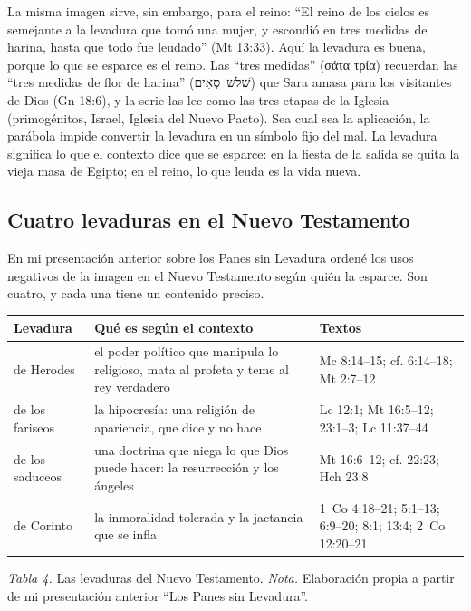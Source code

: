 \documentclass[11pt,letterpaper]{article}
\newcommand{\heb}[1]{\mbox{\foreignlanguage{hebrew}{#1}}}
\newcommand{\grc}[1]{\foreignlanguage{ancientgreek}{#1}}
\begin{document}
La misma imagen sirve, sin embargo, para el reino: ``El reino de los cielos es semejante a la levadura que tomó una mujer, y escondió en tres medidas de harina, hasta que todo fue leudado'' (Mt 13:33). Aquí la levadura es buena, porque lo que se esparce es el reino. Las ``tres medidas'' (\grc{σάτα τρία}) recuerdan las ``tres medidas de flor de harina'' (\heb{שְׁלֹשׁ סְאִים}) que Sara amasa para los visitantes de Dios (Gn 18:6), y la serie las lee como las tres etapas de la Iglesia (primogénitos, Israel, Iglesia del Nuevo Pacto). Sea cual sea la aplicación, la parábola impide convertir la levadura en un símbolo fijo del mal. La levadura significa lo que el contexto dice que se esparce: en la fiesta de la salida se quita la vieja masa de Egipto; en el reino, lo que leuda es la vida nueva.

\subsection{Cuatro levaduras en el Nuevo Testamento}
En mi presentación anterior sobre los Panes sin Levadura ordené los usos negativos de la imagen en el Nuevo Testamento según quién la esparce. Son cuatro, y cada una tiene un contenido preciso.

\begin{center}\begin{minipage}{\linewidth}\centering\small\renewcommand{\arraystretch}{1.22}
\begin{tabular}{@{}L{2.6cm}L{6.4cm}L{6.6cm}@{}}
\toprule
\textbf{Levadura} & \textbf{Qué es según el contexto} & \textbf{Textos} \\ \midrule
de Herodes & el poder político que manipula lo religioso, mata al profeta y teme al rey verdadero & Mc 8:14--15; cf. 6:14--18; Mt 2:7--12 \\
de los fariseos & la hipocresía: una religión de apariencia, que dice y no hace & Lc 12:1; Mt 16:5--12; 23:1--3; Lc 11:37--44 \\
de los saduceos & una doctrina que niega lo que Dios puede hacer: la resurrección y los ángeles & Mt 16:6--12; cf. 22:23; Hch 23:8 \\
de Corinto & la inmoralidad tolerada y la jactancia que se infla & 1~Co 4:18--21; 5:1--13; 6:9--20; 8:1; 13:4; 2~Co 12:20--21 \\
\bottomrule
\end{tabular}\par\nopagebreak
{\footnotesize\color{sepia}\textit{Tabla 4.} Las levaduras del Nuevo Testamento. \textit{Nota.} Elaboración propia a partir de mi presentación anterior ``Los Panes sin Levadura''.}
\end{minipage}\end{center}
\end{document}
